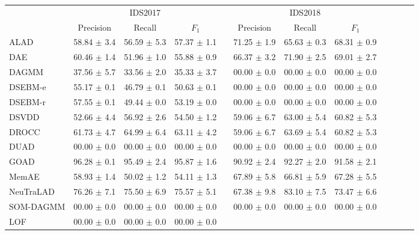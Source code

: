 \begin{table*}[!tbp]
\centering
\begin{tabular}
{@{}lccccccccccc@{}}
\toprule & \multicolumn{3}{c}{IDS2017} & \phantom{a} & \multicolumn{3}{c}{IDS2018} & \phantom{a}  \\
\cmidrule{2-4}
\cmidrule{6-9}
& Precision  & Recall & $F_1$ && Precision & Recall & $F_1$ \\
\hline
ALAD        &  58.84 $\pm$ 3.4 & 56.59 $\pm$ 5.3  & 57.37 $\pm$ 1.1
            && 71.25 $\pm$ 1.9 & 65.63 $\pm$ 0.3  & 68.31 $\pm$ 0.9 \\
DAE         &  60.46 $\pm$ 1.4 & 51.96 $\pm$ 1.0  & 55.88 $\pm$ 0.9
            && 66.37 $\pm$ 3.2 & 71.90 $\pm$ 2.5  & 69.01 $\pm$ 2.7 \\
DAGMM       &  37.56 $\pm$ 5.7 & 33.56 $\pm$ 2.0  & 35.33 $\pm$ 3.7
            && 00.00 $\pm$ 0.0 & 00.00 $\pm$ 0.0  & 00.00 $\pm$ 0.0 \\
DSEBM-e     &  55.17 $\pm$ 0.1 & 46.79 $\pm$ 0.1  & 50.63 $\pm$ 0.1
            && 00.00 $\pm$ 0.0 & 00.00 $\pm$ 0.0  & 00.00 $\pm$ 0.0 \\
DSEBM-r     &  57.55 $\pm$ 0.1 & 49.44 $\pm$ 0.0  & 53.19 $\pm$ 0.0
            && 00.00 $\pm$ 0.0 & 00.00 $\pm$ 0.0  & 00.00 $\pm$ 0.0 \\
DSVDD       &  52.66 $\pm$ 4.4 & 56.92 $\pm$ 2.6  & 54.50 $\pm$ 1.2
            && 59.06 $\pm$ 6.7 & 63.00 $\pm$ 5.4  & 60.82 $\pm$ 5.3 \\
DROCC       &  61.73 $\pm$ 4.7 & 64.99 $\pm$ 6.4  & 63.11 $\pm$ 4.2
            && 59.06 $\pm$ 6.7 & 63.69 $\pm$ 5.4  & 60.82 $\pm$ 5.3 \\
DUAD        &  00.00 $\pm$ 0.0 & 00.00 $\pm$ 0.0  & 00.00 $\pm$ 0.0
            && 00.00 $\pm$ 0.0 & 00.00 $\pm$ 0.0  & 00.00 $\pm$ 0.0 \\
GOAD        &  96.28 $\pm$ 0.1 & 95.49 $\pm$ 2.4  & 95.87 $\pm$ 1.6
            && 90.92 $\pm$ 2.4 & 92.27 $\pm$ 2.0  & 91.58 $\pm$ 2.1 \\
MemAE       &  58.93 $\pm$ 1.4 & 50.02 $\pm$ 1.2  & 54.11 $\pm$ 1.3
            && 67.89 $\pm$ 5.8 & 66.81 $\pm$ 5.9  & 67.28 $\pm$ 5.5 \\
NeuTraLAD    & 76.26 $\pm$ 7.1 & 75.50 $\pm$ 6.9  & 75.57 $\pm$ 5.1
            && 67.38 $\pm$ 9.8 & 83.10 $\pm$ 7.5  & 73.47 $\pm$ 6.6 \\
SOM-DAGMM   &  00.00 $\pm$ 0.0 & 00.00 $\pm$ 0.0  & 00.00 $\pm$ 0.0
            && 00.00 $\pm$ 0.0 & 00.00 $\pm$ 0.0  & 00.00 $\pm$ 0.0 \\
LOF         &  00.00 $\pm$ 0.0 & 00.00 $\pm$ 0.0  & 00.00 $\pm$ 0.0

\end{tabular}
\end{table*}
